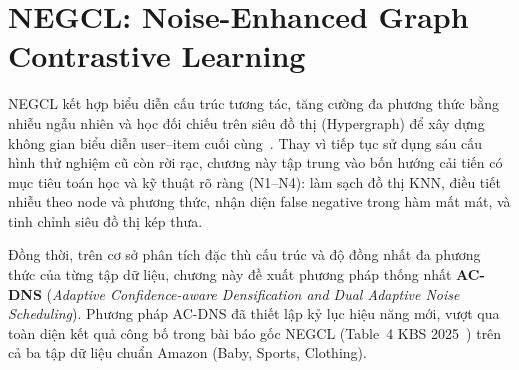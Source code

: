 
\section{NEGCL: Noise-Enhanced Graph Contrastive Learning}
\label{chap:negcl}

NEGCL kết hợp biểu diễn cấu trúc tương tác, tăng cường đa phương thức bằng nhiễu ngẫu nhiên và học đối chiếu trên siêu đồ thị (Hypergraph) để xây dựng không gian biểu diễn user--item cuối cùng~\cite{shi2025negcl}. Thay vì tiếp tục sử dụng sáu cấu hình thử nghiệm cũ còn rời rạc, chương này tập trung vào bốn hướng cải tiến có mục tiêu toán học và kỹ thuật rõ ràng (N1--N4): làm sạch đồ thị KNN, điều tiết nhiễu theo node và phương thức, nhận diện false negative trong hàm mất mát, và tinh chỉnh siêu đồ thị kép thưa. 

Đồng thời, trên cơ sở phân tích đặc thù cấu trúc và độ đồng nhất đa phương thức của từng tập dữ liệu, chương này đề xuất phương pháp thống nhất \textbf{AC-DNS} (\textit{Adaptive Confidence-aware Densification and Dual Adaptive Noise Scheduling}). Phương pháp AC-DNS đã thiết lập kỷ lục hiệu năng mới, vượt qua toàn diện kết quả công bố trong bài báo gốc NEGCL (Table~4 KBS 2025~\cite{shi2025negcl}) trên cả ba tập dữ liệu chuẩn Amazon (Baby, Sports, Clothing).

